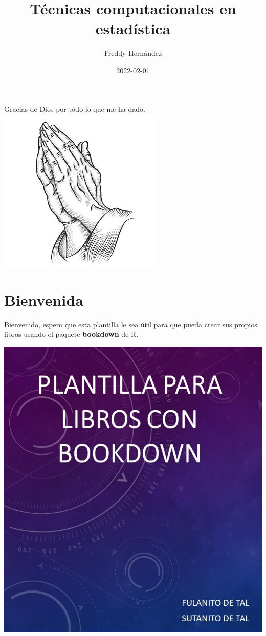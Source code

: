 \documentclass[
]{krantz}
\title{Técnicas computacionales en estadística}
\author{Freddy Hernández}
\date{2022-02-01}
\begin{document}
\maketitle


\thispagestyle{empty}

\begin{center}
	Gracias de Dios por todo lo que me ha dado.
	\includegraphics{images/dedication.jpg}
\end{center}

\setlength{\abovedisplayskip}{-5pt}
\setlength{\abovedisplayshortskip}{-5pt}

{
\hypersetup{linkcolor=}
\setcounter{tocdepth}{2}
\tableofcontents
}
\listoffigures
\listoftables
\hypertarget{bienvenida}{%
\chapter*{Bienvenida}\label{bienvenida}}


Bienvenido, espero que esta plantilla le sea útil para que pueda crear sus propios libros usando el paquete \textbf{bookdown} \citep{R-bookdown} de R.

\begin{center}\includegraphics[width=0.5\linewidth]{images/cover} \end{center}
\end{document}
